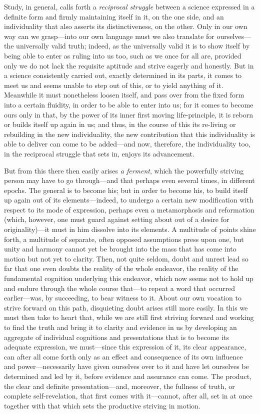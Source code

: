 \documentclass[12pt,a4paper]{book}
\begin{document}
Study, in general, calls forth a \emph{reciprocal struggle} between a science expressed in a definite
form and firmly maintaining itself in it, on the one side, and an individuality that also asserts its
distinctiveness, on the other. Only in our own way can we grasp---into our own language must we also
translate for ourselves---the universally valid truth; indeed, as the universally valid it is to show
itself by being able to enter as ruling into us too, such as we once for all are, provided only we do
not lack the requisite aptitude and strive eagerly and honestly. But in a science consistently
carried out, exactly determined in its parts, it comes to meet us and seems unable to step out of
this, or to yield anything of it. Meanwhile it must nonetheless loosen itself, and pass over from the
fixed form into a certain fluidity, in order to be able to enter into us; for it comes to become ours
only in that, by the power of its inner first moving life-principle, it is reborn or builds itself up
again in us; and thus, in the course of this its re-living or rebuilding in the new individuality, the
new contribution that this individuality is able to deliver can come to be added---and now, therefore,
the individuality too, in the reciprocal struggle that sets in, enjoys its advancement.

But from this there then easily arises \emph{a ferment}, which the powerfully striving person may
have to go through---and that perhaps even several times, in different epochs. The general is to
become his; but in order to become his, to build itself up again out of its elements---indeed, to
undergo a certain new modification with respect to its mode of expression, perhaps even a
metamorphosis and reformation (which, however, one must guard against setting about out of a desire
for originality)---it must in him dissolve into its elements. A multitude of points shine forth, a
multitude of separate, often opposed assumptions press upon one, but unity and harmony cannot yet be
brought into the mass that has come into motion but not yet to clarity. Then, not quite seldom, doubt
and unrest lead so far that one even doubts the reality of the whole endeavor, the reality of the
fundamental cognition underlying this endeavor, which now seems not to hold up and endure through the
whole course that---to repeat a word that occurred earlier---was, by succeeding, to bear witness to
it. About our own vocation to strive forward on this path, disquieting doubt arises still more
easily. In this we must then take to heart that, while we are still first striving forward and
working to find the truth and bring it to clarity and evidence in us by developing an aggregate of
individual cognitions and presentations that is to become its adequate expression, we
must---since this expression of it, its clear appearance, can after all come forth only as an effect
and consequence of its own influence and power---necessarily have given ourselves over to it and have
let ourselves be determined and led by it, before evidence and assurance can come. The product, the
clear and definite presentation---and, moreover, the fullness of truth, or complete self-revelation,
that first comes with it---cannot, after all, set in at once together with that which sets the
productive striving in motion.
\end{document}
